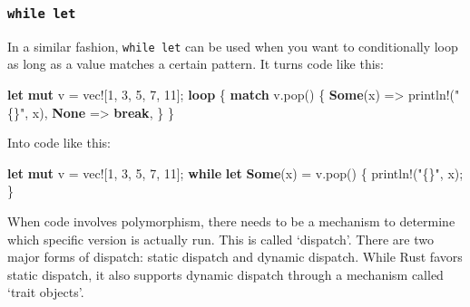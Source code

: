 \documentclass[a4paper,]{book}
\newenvironment{Shaded}{\begin{snugshade}}{\end{snugshade}}
\newcommand{\KeywordTok}[1]{\textcolor[rgb]{0.13,0.29,0.53}{\textbf{{#1}}}}
\newcommand{\DecValTok}[1]{\textcolor[rgb]{0.00,0.00,0.81}{{#1}}}
\newcommand{\StringTok}[1]{\textcolor[rgb]{0.31,0.60,0.02}{{#1}}}
\newcommand{\OtherTok}[1]{\textcolor[rgb]{0.56,0.35,0.01}{{#1}}}
\newcommand{\NormalTok}[1]{{#1}}
\begin{document}
\subsubsection{\texorpdfstring{\texttt{while\ let}}{while let}}\label{while-let}

In a similar fashion, \texttt{while\ let} can be used when you want to
conditionally loop as long as a value matches a certain pattern. It
turns code like this:

\begin{Shaded}
\begin{Highlighting}[]
\KeywordTok{let} \KeywordTok{mut} \NormalTok{v = }\OtherTok{vec!}\NormalTok{[}\DecValTok{1}\NormalTok{, }\DecValTok{3}\NormalTok{, }\DecValTok{5}\NormalTok{, }\DecValTok{7}\NormalTok{, }\DecValTok{11}\NormalTok{];}
\KeywordTok{loop} \NormalTok{\{}
    \KeywordTok{match} \NormalTok{v.pop() \{}
        \KeywordTok{Some}\NormalTok{(x) =>  }\OtherTok{println!}\NormalTok{(}\StringTok{"\{\}"}\NormalTok{, x),}
        \KeywordTok{None} \NormalTok{=> }\KeywordTok{break}\NormalTok{,}
    \NormalTok{\}}
\NormalTok{\}}
\end{Highlighting}
\end{Shaded}

Into code like this:

\begin{Shaded}
\begin{Highlighting}[]
\KeywordTok{let} \KeywordTok{mut} \NormalTok{v = }\OtherTok{vec!}\NormalTok{[}\DecValTok{1}\NormalTok{, }\DecValTok{3}\NormalTok{, }\DecValTok{5}\NormalTok{, }\DecValTok{7}\NormalTok{, }\DecValTok{11}\NormalTok{];}
\KeywordTok{while} \KeywordTok{let} \KeywordTok{Some}\NormalTok{(x) = v.pop() \{}
    \OtherTok{println!}\NormalTok{(}\StringTok{"\{\}"}\NormalTok{, x);}
\NormalTok{\}}
\end{Highlighting}
\end{Shaded}


When code involves polymorphism, there needs to be a mechanism to
determine which specific version is actually run. This is called
`dispatch'. There are two major forms of dispatch: static dispatch and
dynamic dispatch. While Rust favors static dispatch, it also supports
dynamic dispatch through a mechanism called `trait objects'.
\end{document}
